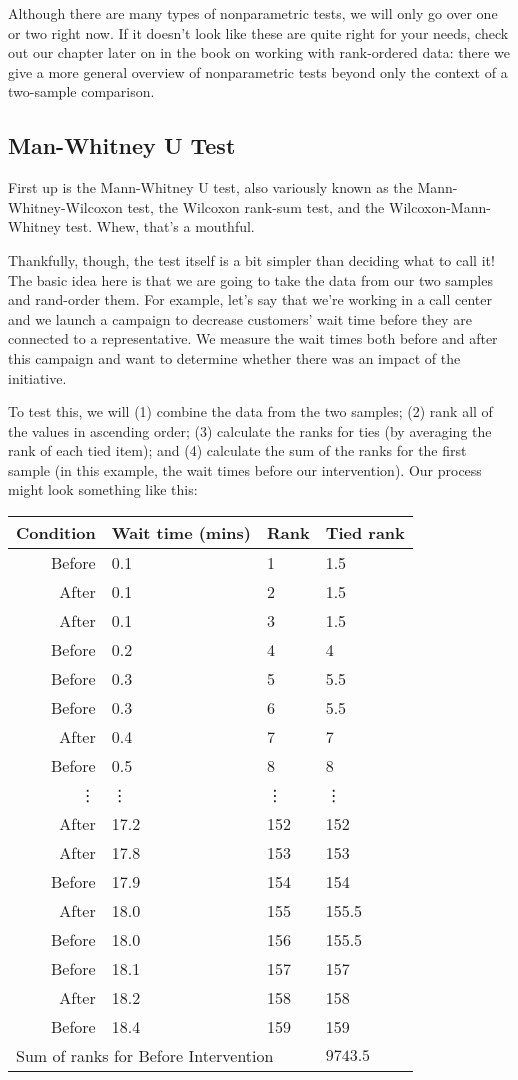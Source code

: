 Although there are many types of nonparametric tests, we will only go over one or two right now. If it doesn't look like these are quite right for your needs, check out our chapter later on in the book on working with rank-ordered data: there we give a more general overview of nonparametric tests beyond only the context of a two-sample comparison.

\subsection{Man-Whitney U Test}

First up is the Mann-Whitney U test, also variously known as the Mann-Whitney-Wilcoxon test, the Wilcoxon rank-sum test, and the Wilcoxon-Mann-Whitney test. Whew, that's a mouthful.

Thankfully, though, the test itself is a bit simpler than deciding what to call it! The basic idea here is that we are going to take the data from our two samples and rand-order them. For example, let's say that we're working in a call center and we launch a campaign to decrease customers' wait time before they are connected to a representative. We measure the wait times both before and after this campaign and want to determine whether there was an impact of the initiative.

To test this, we will (1) combine the data from the two samples; (2) rank all of the values in ascending order; (3) calculate the ranks for ties (by averaging the rank of each tied item); and (4) calculate the sum of the ranks for the first sample (in this example, the wait times before our intervention). Our process might look something like this:

\begin{tabular}{r | l l l}
Condition & Wait time (mins) & Rank & Tied rank \\
\hline
Before & 0.1 & 1 & 1.5 \\
After & 0.1 & 2 & 1.5 \\
After & 0.1 & 3 & 1.5 \\
Before & 0.2 & 4 & 4 \\
Before & 0.3 & 5 & 5.5 \\
Before & 0.3 & 6 & 5.5 \\
After & 0.4 & 7 & 7 \\
Before & 0.5 & 8  & 8 \\
\vdots & \vdots & \vdots & \vdots \\
After & 17.2 & 152 & 152 \\
After & 17.8 & 153 & 153 \\
Before & 17.9 & 154 & 154 \\
After & 18.0 & 155 & 155.5 \\
Before & 18.0 & 156 & 155.5 \\
Before & 18.1 & 157 & 157 \\
After & 18.2 & 158 & 158 \\
Before & 18.4 & 159 & 159 \\
\hline
\multicolumn{3}{l}{Sum of ranks for Before Intervention} & $9743.5$ \\
\end{tabular}

